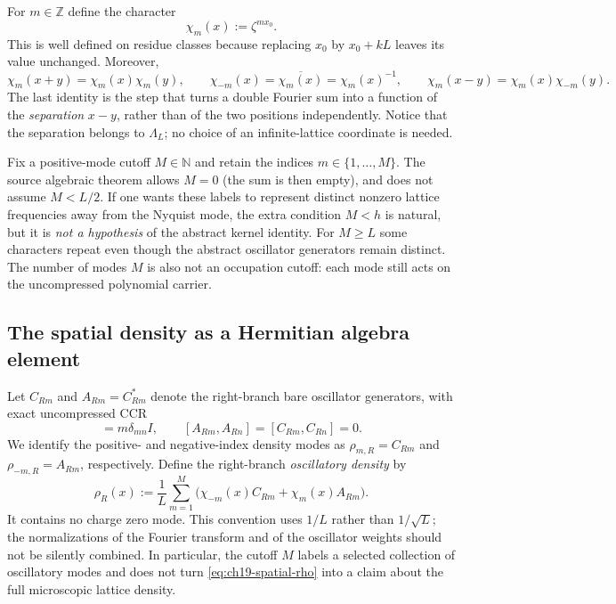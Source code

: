 For $m\in\mathbb Z$ define the character
\begin{equation}
 \chi_m(x):=\zeta^{m x_0}.
 \label{eq:ch19-spatial-character}
\end{equation}
This is well defined on residue classes because replacing $x_0$ by
$x_0+kL$ leaves its value unchanged.  Moreover,
\begin{equation}
 \chi_m(x+y)=\chi_m(x)\chi_m(y),\qquad
 \chi_{-m}(x)=\overline{\chi_m(x)}=\chi_m(x)^{-1},\qquad
 \chi_m(x-y)=\chi_m(x)\chi_{-m}(y).
 \label{eq:ch19-spatial-character-laws}
\end{equation}
The last identity is the step that turns a double Fourier sum into a
function of the \emph{separation} $x-y$, rather than of the two
positions independently.  Notice that the separation belongs to
$\Lambda_L$; no choice of an infinite-lattice coordinate is needed.

Fix a positive-mode cutoff $M\in\mathbb N$ and retain the indices
$m\in\{1,\ldots,M\}$.  The source algebraic theorem allows $M=0$
(the sum is then empty), and does not assume $M<L/2$.  If one wants
these labels to represent distinct nonzero lattice frequencies away
from the Nyquist mode, the extra condition $M<h$ is natural, but it is
\emph{not a hypothesis} of the abstract kernel identity.  For $M\geq L$
some characters repeat even though the abstract oscillator generators
remain distinct.  The number of modes $M$ is also not an occupation
cutoff: each mode still acts on the uncompressed polynomial carrier.

\subsection{The spatial density as a Hermitian algebra element}

Let $C_{Rm}$ and $A_{Rm}=C_{Rm}^{*}$ denote the right-branch bare
oscillator generators, with exact uncompressed CCR
\begin{equation}
 [A_{Rm},C_{Rn}]=m\delta_{mn}I,\qquad
 [A_{Rm},A_{Rn}]=[C_{Rm},C_{Rn}]=0.
 \label{eq:ch19-spatial-ccr}
\end{equation}
We identify the positive- and negative-index density modes as
$\rho_{m,R}=C_{Rm}$ and $\rho_{-m,R}=A_{Rm}$, respectively.
Define the right-branch \emph{oscillatory density} by
\begin{equation}
 \rho_R(x):=\frac1L\sum_{m=1}^{M}
 \bigl(\chi_{-m}(x)C_{Rm}+\chi_m(x)A_{Rm}\bigr).
 \label{eq:ch19-spatial-rho}
\end{equation}
It contains no charge zero mode.  This convention uses $1/L$ rather
than $1/\sqrt L$; the normalizations of the Fourier transform and of
the oscillator weights should not be silently combined.  In
particular, the cutoff $M$ labels a selected collection of oscillatory
modes and does not turn \eqref{eq:ch19-spatial-rho} into a claim about
the full microscopic lattice density.

